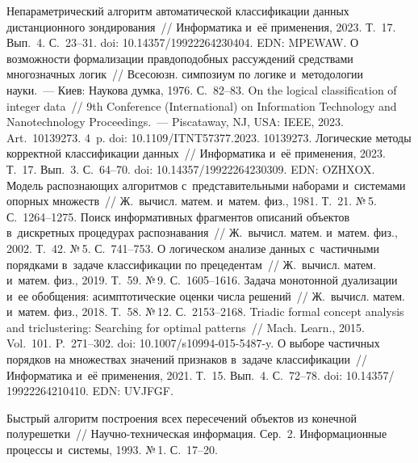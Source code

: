 \begin{multicols}{2}
{{\begin{thebibliography}{99}
 Не\-па\-ра\-мет\-ри\-че\-ский алгоритм 
автоматической классификации данных дистанционного зондирования~// Информатика и~её применения, 2023. Т.~17. Вып.~4. С.~23--31. doi: 10.14357/19922264230404. EDN: 
MPEWAW.
 О возможности формализации правдоподобных рассуждений средствами 
многозначных логик~// Всесоюзн. симпозиум по логике и~методологии науки.~--- Киев: 
Наукова думка, 1976. С.~82--83. 
 On the logical classification of integer data~// 9th  
Conference (International) on Information Technology and Nanotechnology Proceedings.~--- 
Piscataway, NJ, USA: IEEE, 2023. Art.~10139273. 4~p. doi: 
10.1109/ITNT57377.2023. 10139273. 
 Логические методы корректной 
классификации данных~// Информатика и~её применения, 2023. Т.~17. Вып.~3. С.~64--70. 
doi: 10.14357/19922264230309. EDN: \mbox{OZHXOX}.
 Модель распознающих алгоритмов с~представительными наборами 
и~сис\-те\-ма\-ми опорных множеств~// Ж.~вычисл. матем. и~матем. физ., 1981. Т.~21. №\,5. С.~1264--1275. 
 Поиск информативных фрагментов описаний объектов 
в~дискретных процедурах распознавания~// Ж.~вычисл. матем. и~матем. физ., 2002. Т.~42. 
№\,5. С.~741--753. 
 О логическом анализе данных 
с~час\-тич\-ны\-ми порядками в~задаче классификации по прецедентам~// Ж.~вычисл. матем. 
и~матем. физ., 2019. Т.~59. №\,9. С.~1605--1616.
 Задача монотонной дуализации и~ее обобщения: 
асимптотические оценки числа решений~// Ж.~вычисл. матем. и~матем. физ., 2018. Т.~58. 
№\,12. С.~2153--2168.
 Triadic formal concept 
analysis and triclustering: Searching for optimal patterns~// Mach. Learn., 2015. Vol.~101. 
P.~271--302.  doi: 10.1007/s10994-015-5487-y.
 О выборе частичных порядков на множествах значений 
признаков в~задаче классификации~// Информатика и~её применения, 2021. Т.~15. Вып.~4. 
С.~72--78.  doi: 10.14357/ 19922264210410. EDN: UVJFGF.

 Быстрый алгоритм построения всех пересечений объектов из конечной 
полурешетки~// На\-уч\-но-тех\-ни\-че\-ская информация. Сер.~2. Информационные 
процессы и~системы, 1993. №\,1. С.~17--20. 
\end{thebibliography}

 }
 }

\end{multicols}

